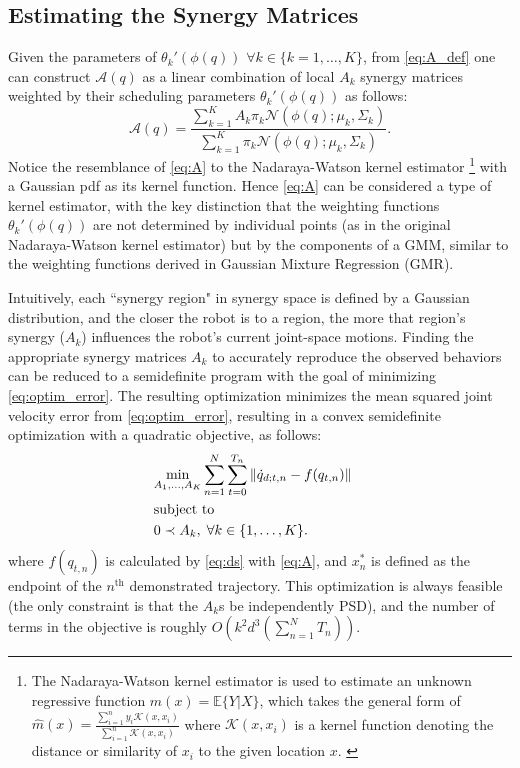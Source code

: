 \documentclass[letterpaper, 10 pt, conference,fleqn]{ieeeconf}
\begin{document}
\subsection{Estimating the Synergy Matrices}
Given the parameters of $\theta_k'(\phi(q))$ $\forall k \in \{k=1,\dots,K\}$, from \eqref{eq:A_def} one can construct $\mathcal{A}(q)$ as a linear combination of local $A_k$ synergy matrices weighted by their scheduling parameters $\theta_k'(\phi(q))$ as follows: 
\begin{equation}
\label{eq:A}
\mathcal{A}(q) = \frac{\sum_{k=1}^K A_k \pi_k\mathcal{N}(\phi(q); \mu_k, \Sigma_k)}{\sum_{k=1}^K \pi_k\mathcal{N} (\phi(q); \mu_k, \Sigma_k)}.
\end{equation} 
Notice the resemblance of \eqref{eq:A} to the Nadaraya-Watson kernel estimator \cite{nadaraya1964regress,watson1964regress}\footnote{The Nadaraya-Watson kernel estimator is used to estimate an unknown regressive function $m(x) = \mathbb{E}\{Y|X\}$, which takes the general form of $\widehat{m}(x) = \frac{\sum_{i=1}^n y_i \mathcal{K}(x,x_i)}{\sum_{i=1}^n \mathcal{K}(x,x_i)}$ where $\mathcal{K}(x,x_i)$ is a kernel function denoting the distance or similarity of $x_i$ to the given location $x$. \cite{nadaraya1964regress,watson1964regress}} with a Gaussian pdf as its kernel function. Hence \eqref{eq:A} can be considered a type of kernel estimator, with the key distinction that the weighting functions $\theta_k'(\phi(q))$ are not determined by individual points (as in the original Nadaraya-Watson kernel estimator) but by the components of a GMM, similar to the weighting functions derived in Gaussian Mixture Regression (GMR). 

Intuitively, each ``synergy region" in synergy space is defined by a Gaussian distribution, and the closer the robot is to a region, the more that region's synergy ($A_k$) influences the robot's current joint-space motions. Finding the appropriate synergy matrices $A_k$ to accurately reproduce the observed behaviors can be reduced to a semidefinite program with the goal of minimizing \eqref{eq:optim_error}. The resulting optimization minimizes the mean squared joint velocity error from \eqref{eq:optim_error}, resulting in a convex semidefinite optimization with a quadratic objective, as follows:
\begin{equation}
\vspace{-10pt}
\begin{aligned}
&\underset{A_1, \dots, A_K}{\text{min}} 
\sum_{n=1}^N\sum_{t=0}^{T_n} \left \| \dot{q}_{d;t,n} - f(q_{t,n}) \right \| \\
& \text{subject to}&\\
&  0 \prec A_k, \; \forall k \in \{1, \dots, K\}. &
\end{aligned}
\label{eq:opt}
\end{equation}
where $f(q_{t,n})$ is calculated by %
 \eqref{eq:ds} with \eqref{eq:A}, and $x^*_{n}$ is defined as the endpoint of the $ n^{\text{th}} $ demonstrated trajectory. This optimization is always feasible (the only constraint is that the $A_k$s be independently PSD), and the number of terms in the objective is roughly $O\left(k^2d^3\left( \sum_{n=1}^N T_n\right)\right)$.
\end{document}
